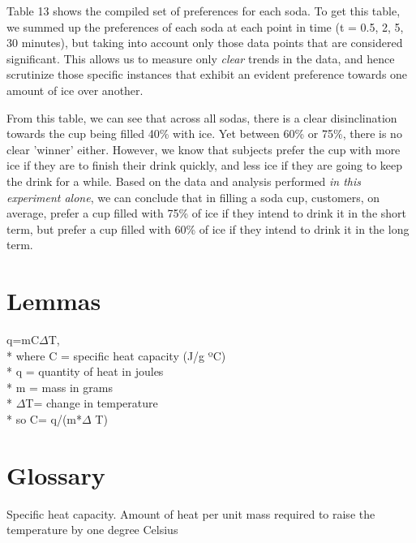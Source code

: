 \documentclass[oneside,12pt]{report}
\begin{document}
\vspace{24pt}
Table 13 shows the compiled set of preferences for each soda. To get this table,  we summed up the preferences of each soda at each point in time (t = 0.5, 2, 5, 30 minutes), but taking into account only those data points that are considered significant. This allows us to measure only \emph{clear} trends in the data, and hence scrutinize those specific instances that exhibit an evident preference towards one amount of ice over another. 

\vspace{12pt}
From this table, we can see that across all sodas, there is a clear disinclination towards the cup being filled 40\% with ice. Yet between 60\% or 75\%, there is no clear 'winner' either. However, we know that subjects prefer the cup with more ice if they are to finish their drink quickly, and less ice if they are going to keep the drink for a while. Based on the data and analysis performed \emph{in this experiment alone}, we can conclude that in filling a soda cup, customers, on average, prefer a cup filled with 75\% of ice if they intend to drink it in the short term, but prefer a cup filled with 60\% of ice if they intend to drink it in the long term.

%
%
%
%
%
%


\appendix
{}

\chapter{Lemmas}\label{Lemma}
\vspace{12pt} 

q=mC$\Delta$T,
\\*  where C = specific heat capacity (J/g ºC)
\\* q = quantity of heat in joules 
\\* m = mass in grams
\\* $\Delta$T= change in temperature
\\*  so C= q/(m*$\Delta$ T)

\chapter{Glossary}\label{Glossary}

\vspace{10pt} 

\vspace{8pt}
\noindent Specific heat capacity. Amount of heat per unit mass required to raise the temperature by one degree Celsius
\end{document}
